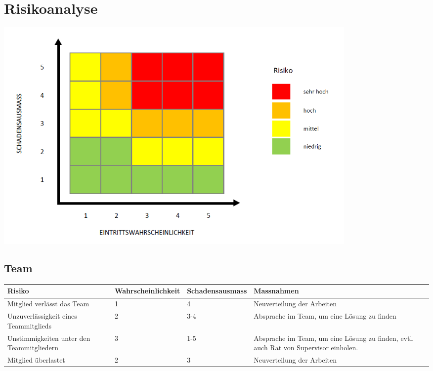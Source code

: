 \section{Risikoanalyse}

\includegraphics[width=0.8\textwidth]{Images/risikomatrix.png}

\subsection{Team}
\begin{table}[h]
\begin{tabular}{|p{3cm}|p{3cm}|p{3cm}|p{4cm}|}\hline
	
	\textbf{Risiko}	& 	\textbf{Wahrscheinlichkeit} & \textbf{Schadensausmass}  & \textbf{Massnahmen} \\\hline
	

	Mitglied verlässt das Team	&	1	&	4	&	Neuverteilung der Arbeiten \\\hline
	Unzuverlässigkeit eines Teammitglieds	&	2	&	3-4	&	 Absprache im Team, um eine Lösung zu finden  \\\hline
	Unstimmigkeiten unter den Teammitgliedern	& 	3	&	1-5	& Absprache im Team, um eine Lösung zu finden, evtl. auch Rat von Supervisor einholen.  \\\hline
	Mitglied überlastet	&	2	&	3	&	Neuverteilung der Arbeiten \\\hline
\end{tabular}\\
\end{table}

